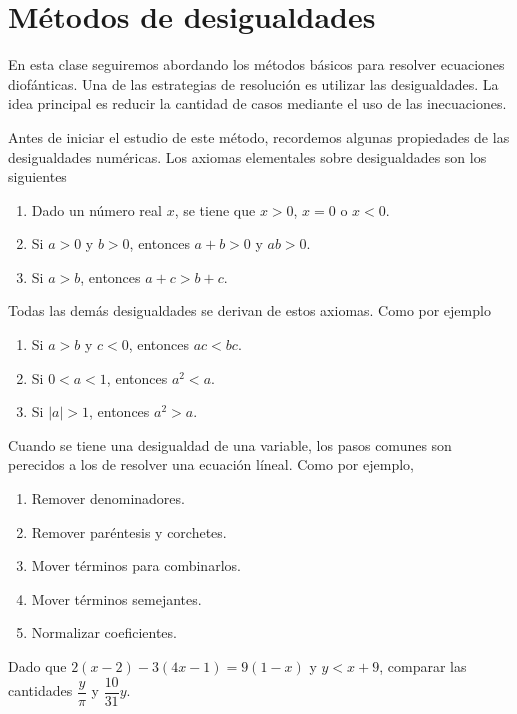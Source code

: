 \section{Métodos de desigualdades}

En esta clase seguiremos abordando los métodos básicos para resolver ecuaciones diofánticas.
Una de las estrategias de resolución es utilizar las desigualdades.
La idea principal es reducir la cantidad de casos mediante el uso de las inecuaciones.

Antes de iniciar el estudio de este método, recordemos algunas propiedades de las desigualdades numéricas.
Los axiomas elementales sobre desigualdades son los siguientes

\begin{enumerate}
    \item Dado un número real $x$, se tiene que $x > 0$, $x = 0$ o $x < 0$.
    \item Si $a > 0$ y $b > 0$, entonces $a + b > 0$ y $ab > 0$.
    \item Si $a > b$, entonces $a + c > b + c$.
\end{enumerate}
Todas las demás desigualdades se derivan de estos axiomas.
Como por ejemplo
\begin{enumerate}
    \item Si $a > b$ y $c < 0$, entonces $ac < bc$.
    \item Si $0 < a < 1$, entonces $a^2 < a$.
    \item Si $|a| > 1$, entonces $a^2 > a$.
\end{enumerate}

Cuando se tiene una desigualdad de una variable, los pasos comunes son perecidos a los de resolver una ecuación líneal.
Como por ejemplo,
\begin{multicols}{2}
    \begin{enumerate}
        \item Remover denominadores.
        \item Remover paréntesis y corchetes.
        \item Mover términos para combinarlos.
        \item Mover términos semejantes.
        \item Normalizar coeficientes.
    \end{enumerate}
\end{multicols}

\begin{example}
    Dado que $2(x - 2) - 3(4x - 1) = 9(1 - x)$ y $y < x + 9$, comparar las cantidades $\dfrac{y}{\pi}$ y $\dfrac{10}{31}y$.
\end{example}


